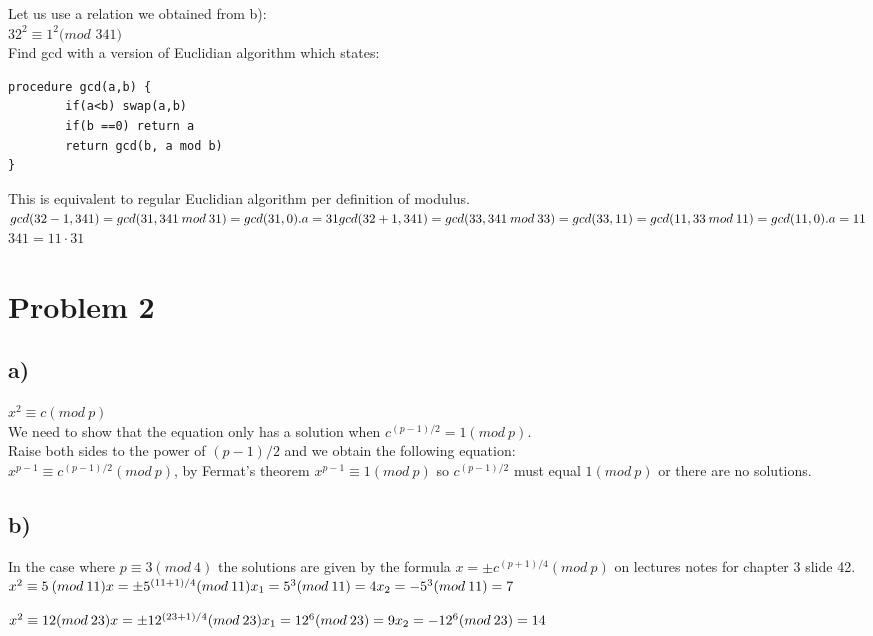 \documentclass{article}
\begin{document}
Let us use a relation we obtained from b):\\
$32^{2} \equiv 1^{2} (mod$ $341)$\\
Find gcd with a version of Euclidian algorithm which states: 
\begin{verbatim}
procedure gcd(a,b) {
		if(a<b) swap(a,b)
		if(b ==0) return a
		return gcd(b, a mod b)
}
\end{verbatim}
This is equivalent to regular Euclidian algorithm per definition of modulus.
$
gcd(32-1, 341) = gcd(31, 341 \: mod \: 31) =  gcd(31,0). a = 31\\
gcd(32+1, 341) = gcd(33, 341 \: mod \: 33) =  gcd(33,11) = gcd(11, 33 \: mod \: 11) = gcd(11,0). a = 11\\
$
$341 = 11 \cdotp 31$

\section*{Problem 2}

\subsection*{a)}
$x^{2} \equiv c (mod \: p)$\\
We need to show that the equation only has a solution when $c^{(p-1)/2} = 1 (mod \: p)$.\\
Raise both sides to the power of $(p-1)/2$ and we obtain the following equation:\\
$x^{p-1} \equiv c^{(p-1)/2} (mod \: p)$, by Fermat's theorem $x^{p-1} \equiv 1 (mod \: p)$ so $c^{(p-1)/2}$ must equal $1 (mod \: p)$ or there are no solutions.

\subsection*{b)}

In the case where $p \equiv 3(mod \: 4)$ the solutions are given by the formula $x = \pm c^{(p+1)/4} (mod\:p)$ on lectures notes for chapter 3 slide 42.\\
$
x^{2} \equiv 5\:(mod \: 11)\\
x = \pm 5^{(11+1)/4}(mod \: 11)\\
x_{1} = 5^{3}(mod \: 11) = 4\\
x_{2} = -5^{3}(mod \: 11) = 7
$

$
x^{2} \equiv 12(mod \: 23)\\
x = \pm 12^{(23+1)/4}(mod \: 23)\\
x_{1} = 12^{6}(mod \: 23) = 9\\
x_{2} = -12^{6}(mod \: 23) = 14
$
\end{document}
